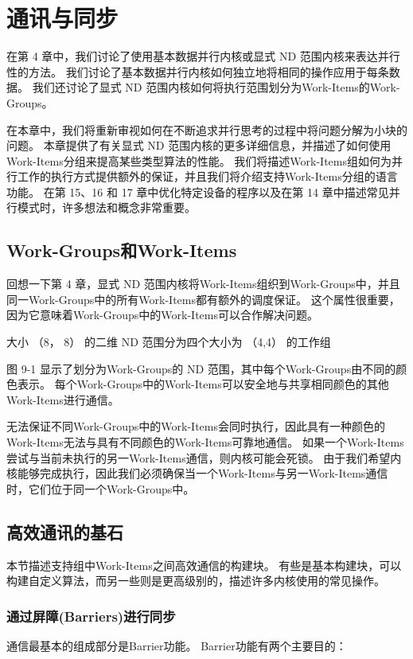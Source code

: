 \section{通讯与同步}
在第 4 章中，我们讨论了使用基本数据并行内核或显式 ND 范围内核来表达并行性的方法。 
我们讨论了基本数据并行内核如何独立地将相同的操作应用于每条数据。 
我们还讨论了显式 ND 范围内核如何将执行范围划分为Work-Items的Work-Groups。

在本章中，我们将重新审视如何在不断追求并行思考的过程中将问题分解为小块的问题。 
本章提供了有关显式 ND 范围内核的更多详细信息，并描述了如何使用Work-Items分组来提高某些类型算法的性能。 
我们将描述Work-Items组如何为并行工作的执行方式提供额外的保证，并且我们将介绍支持Work-Items分组的语言功能。 
在第 15、16 和 17 章中优化特定设备的程序以及在第 14 章中描述常见并行模式时，许多想法和概念非常重要。

\subsection{Work-Groups和Work-Items}
回想一下第 4 章，显式 ND 范围内核将Work-Items组织到Work-Groups中，并且同一Work-Groups中的所有Work-Items都有额外的调度保证。 
这个属性很重要，因为它意味着Work-Groups中的Work-Items可以合作解决问题。

{\color{red} 大小 （8， 8） 的二维 ND 范围分为四个大小为 （4,4） 的工作组}

图 9-1 显示了划分为Work-Groups的 ND 范围，其中每个Work-Groups由不同的颜色表示。 
每个Work-Groups中的Work-Items可以安全地与共享相同颜色的其他Work-Items进行通信。

无法保证不同Work-Groups中的Work-Items会同时执行，因此具有一种颜色的Work-Items无法与具有不同颜色的Work-Items可靠地通信。 
如果一个Work-Items尝试与当前未执行的另一Work-Items通信，则内核可能会死锁。 
由于我们希望内核能够完成执行，因此我们必须确保当一个Work-Items与另一Work-Items通信时，它们位于同一个Work-Groups中。

\subsection{高效通讯的基石}
本节描述支持组中Work-Items之间高效通信的构建块。 
有些是基本构建块，可以构建自定义算法，而另一些则是更高级别的，描述许多内核使用的常见操作。

\subsubsection{通过屏障(Barriers)进行同步}
通信最基本的组成部分是Barrier功能。 Barrier功能有两个主要目的：

